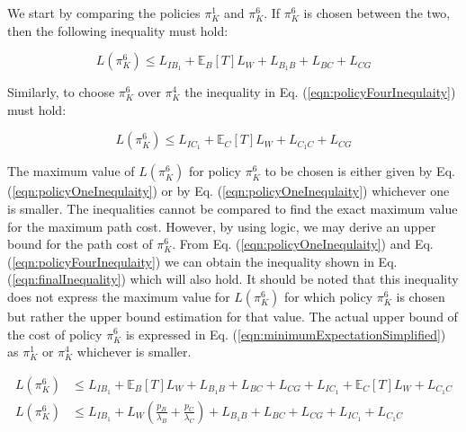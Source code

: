 \documentclass[a4paper,12pt]{article}
\begin{document}
			We start by comparing the policies $\pi_{K}^{1}$ and $\pi_{K}^{6}$. If $\pi_{K}^{6}$ is chosen between the two, then the following inequality must hold:
			
			\begin{equation}
			L\left(\pi_{K}^{6}\right) \leq L_{IB_1} + \mathbb{E}_{B}\left[T\right]L_W + L_{B_1B} + L_{BC} + L_{CG}
			\label{eqn:policyOneInequlaity}
			\end{equation}
			
			Similarly, to choose $\pi_{K}^{6}$ over $\pi_{K}^{4}$ the inequality in Eq. (\ref{eqn:policyFourInequlaity}) must hold:
			
			\begin{equation}
			L\left(\pi_{K}^{6}\right) \leq L_{IC_1} + \mathbb{E}_{C}\left[T\right]L_W + L_{C_1C} + L_{CG}
			\label{eqn:policyFourInequlaity}
			\end{equation}
			
			The maximum value of $L\left(\pi_{K}^{6}\right)$ for policy $\pi_{K}^{6}$ to be chosen is either given by Eq. (\ref{eqn:policyOneInequlaity}) or by Eq. (\ref{eqn:policyOneInequlaity}) whichever one is smaller. The inequalities cannot be compared to find the exact maximum value for the maximum path cost.  However, by using logic, we may derive an upper bound for the path cost of $\pi_{K}^{6}$. From Eq. (\ref{eqn:policyOneInequlaity}) and Eq. (\ref{eqn:policyFourInequlaity}) we can obtain the inequality shown in Eq. (\ref{eqn:finalInequality}) which will also hold. It should be noted that this inequality does not express the maximum value for $L\left(\pi_{K}^{6}\right)$ for which policy $\pi_{K}^{6}$ is chosen but rather the upper bound estimation for that value. The actual upper bound of the cost of policy $\pi_{K}^{6}$ is expressed in Eq. (\ref{eqn:minimumExpectationSimplified}) as $\pi_{K}^{1}$ or $\pi_{K}^{4}$ whichever is smaller.
			
			\begin{equation}
			\begin{split}
			L\left(\pi_{K}^{6}\right) &\leq L_{IB_1} + \mathbb{E}_{B}\left[T\right]L_W + L_{B_1B} + L_{BC} + L_{CG} + L_{IC_1} + \mathbb{E}_{C}\left[T\right]L_W + L_{C_1C} \\
			L\left(\pi_{K}^{6}\right) &\leq L_{IB_1} + L_W(\frac{p_B}{\lambda_{B}} + \frac{p_C}{\lambda_{C}}) + L_{B_1B} + L_{BC} + L_{CG} + L_{IC_1} + L_{C_1C}
			\end{split}
			\label{eqn:finalInequality}
			\end{equation}
			
\end{document}
